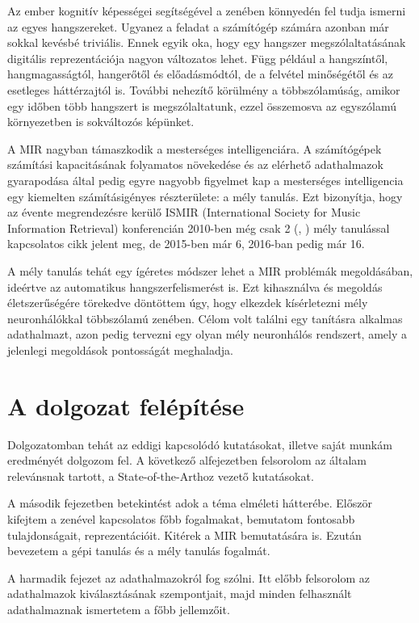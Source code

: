 Az ember kognitív képességei segítségével a zenében könnyedén fel tudja ismerni az egyes hangszereket. Ugyanez a feladat a számítógép számára azonban már sokkal kevésbé triviális. Ennek egyik oka, hogy egy hangszer megszólaltatásának digitális reprezentációja nagyon változatos lehet. Függ például a hangszíntől, hangmagasságtól, hangerőtől és előadásmódtól, de a felvétel minőségétől és az esetleges háttérzajtól is. További nehezítő körülmény a többszólamúság, amikor egy időben több hangszert is megszólaltatunk, ezzel összemosva az egyszólamú környezetben is sokváltozós képünket.

A MIR nagyban támaszkodik a mesterséges intelligenciára. A számítógépek számítási kapacitásának folyamatos növekedése és az elérhető adathalmazok gyarapodása által pedig egyre nagyobb figyelmet kap a mesterséges intelligencia egy kiemelten számításigényes részterülete: a mély tanulás. Ezt bizonyítja, hogy az évente megrendezésre kerülő ISMIR (International Society for Music Information Retrieval) konferencián 2010-ben még csak 2 (\cite{florian2010}, \cite{Hamel2010}) mély tanulással kapcsolatos cikk jelent meg, de 2015-ben már 6, 2016-ban pedig már 16. \cite{choi2017tutorial}

A mély tanulás tehát egy ígéretes módszer lehet a MIR problémák megoldásában, ideértve az automatikus hangszerfelismerést is. Ezt kihasználva és megoldás életszerűségére törekedve döntöttem úgy, hogy elkezdek kísérletezni mély neuronhálókkal többszólamú zenében. Célom volt találni egy tanításra alkalmas adathalmazt, azon pedig tervezni egy olyan mély neuronhálós rendszert, amely a jelenlegi megoldások pontosságát meghaladja.


\section{A dolgozat felépítése}

Dolgozatomban tehát az eddigi kapcsolódó kutatásokat, illetve saját munkám eredményét dolgozom fel. A következő alfejezetben felsorolom az általam relevánsnak tartott, a State-of-the-Arthoz vezető kutatásokat. 

A második fejezetben betekintést adok a téma elméleti hátterébe. Először kifejtem a zenével kapcsolatos főbb fogalmakat, bemutatom fontosabb tulajdonságait, reprezentációit. Kitérek a MIR bemutatására is. Ezután bevezetem a gépi tanulás és a mély tanulás fogalmát. 

A harmadik fejezet az adathalmazokról fog szólni. Itt előbb felsorolom az adathalmazok kiválasztásának szempontjait, majd minden felhasznált adathalmaznak ismertetem a főbb jellemzőit. 

